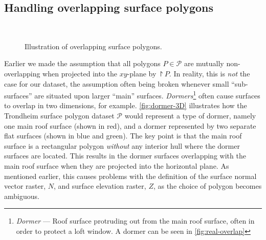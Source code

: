 \subsection{Handling overlapping surface polygons}%
\label{sec:overlapping-fix}

\begin{figure}
  \centering
  \hspace{3em}
  \\\vspace{1em}
  \hspace{3em}
  \caption{%
    Illustration of overlapping surface polygons.
  }
  \label{fig:overlapping-polygons}
\end{figure}
Earlier we made the assumption that all polygons $P \in \mathcal{P}$ are mutually non-overlapping when projected into the $xy$-plane by $\project{P}$.
In reality, this is \emph{not} the case for our dataset, the assumption often being broken whenever small \enquote{sub-surfaces} are situated upon larger \enquote{main} surfaces.
\textit{Dormers}\footnote{\textit{Dormer} --- Roof surface protruding out from the main roof surface, often in order to protect a loft window. A dormer can be seen in \cref{fig:real-overlap}} often cause surfaces to overlap in two dimensions, for example.
\cref{fig:dormer-3D} illustrates how the Trondheim surface polygon dataset $\mathcal{P}$ would represent a type of dormer, namely one main roof surface (shown in \textcolor{red!80}{red}), and a dormer represented by two separate flat surfaces (shown in \textcolor{blue!80}{blue} and \textcolor{green!80}{green}).
The key point is that the main roof surface is a rectangular polygon \emph{without} any interior hull where the dormer surfaces are located.
This results in the dormer surfaces overlapping with the main roof surface when they are projected into the horizontal plane.
As mentioned earlier, this causes problems with the definition of the surface normal vector raster, $N$, and surface elevation raster, $Z$, as the choice of polygon becomes ambiguous.
